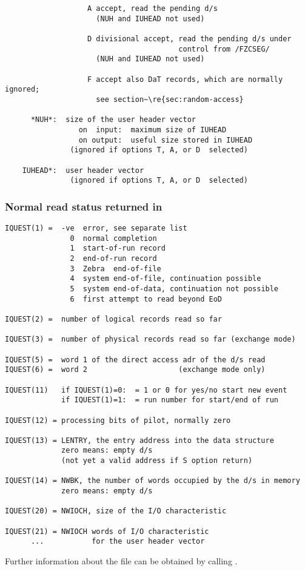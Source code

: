 \begin{verbatim}
                   A accept, read the pending d/s
                     (NUH and IUHEAD not used)

                   D divisional accept, read the pending d/s under
                                        control from /FZCSEG/
                     (NUH and IUHEAD not used)

                   F accept also DaT records, which are normally ignored;
                     see section~\re{sec:random-access} 

      *NUH*:  size of the user header vector
                 on  input:  maximum size of IUHEAD
                 on output:  useful size stored in IUHEAD
               (ignored if options T, A, or D  selected)

    IUHEAD*:  user header vector
               (ignored if options T, A, or D  selected)
\end{verbatim}

\subsubsection*{Normal read status returned in }

\begin{verbatim}
IQUEST(1) =  -ve  error, see separate list
               0  normal completion
               1  start-of-run record
               2  end-of-run record
               3  Zebra  end-of-file
               4  system end-of-file, continuation possible
               5  system end-of-data, continuation not possible
               6  first attempt to read beyond EoD

IQUEST(2) =  number of logical records read so far

IQUEST(3) =  number of physical records read so far (exchange mode)

IQUEST(5) =  word 1 of the direct access adr of the d/s read
IQUEST(6) =  word 2                     (exchange mode only)

IQUEST(11)   if IQUEST(1)=0:  = 1 or 0 for yes/no start new event
             if IQUEST(1)=1:  = run number for start/end of run

IQUEST(12) = processing bits of pilot, normally zero

IQUEST(13) = LENTRY, the entry address into the data structure
             zero means: empty d/s
             (not yet a valid address if S option return)

IQUEST(14) = NWBK, the number of words occupied by the d/s in memory
             zero means: empty d/s

IQUEST(20) = NWIOCH, size of the I/O characteristic

IQUEST(21) = NWIOCH words of I/O characteristic
      ...           for the user header vector
\end{verbatim}
   Further information about the file can be obtained
   by calling .

